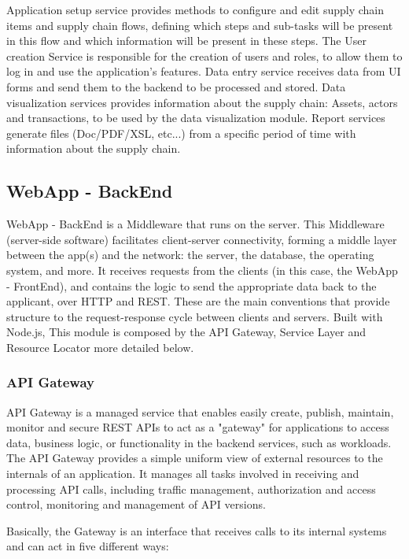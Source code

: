 Application setup service provides methods to configure and edit  supply chain items and supply chain flows, defining which steps and sub-tasks will be present in this flow and which information will be present in these steps. The User creation Service is responsible for the creation of users and roles, to allow them to log in and use the application’s features. Data entry service receives data from UI forms and send them to the backend to be processed and stored. Data visualization services provides information about the supply chain: Assets, actors and transactions, to be used by the data visualization module. Report services generate files (Doc/PDF/XSL, etc...) from a specific period of time with information about the supply chain.

\subsection{WebApp - BackEnd}\label{sec:WebAppBackEnd}
WebApp - BackEnd is a Middleware that runs on the server. This Middleware (server-side software) facilitates client-server connectivity, forming a middle layer between the app(s) and the network: the server, the database, the operating system, and more. It receives requests from the clients (in this case, the WebApp - FrontEnd), and contains the logic to send the appropriate data back to the applicant, over HTTP and REST.  These are the main conventions that provide structure to the request-response cycle between clients and servers. Built with Node.js, This module  is composed by the API Gateway, Service Layer and Resource Locator more detailed below.

\subsubsection{API Gateway}\label{sec:APIGateway}
API Gateway is a managed service that enables easily create, publish, maintain, monitor and secure REST APIs to act as a "gateway" for applications to access data, business logic, or functionality in the backend services, such as workloads. The API Gateway provides a simple uniform view of external resources to the internals of an application. It manages all tasks involved in receiving and processing API calls, including traffic management, authorization and access control, monitoring and management of API versions.

Basically, the Gateway is an interface that receives calls to its internal systems and can act in five different ways:

